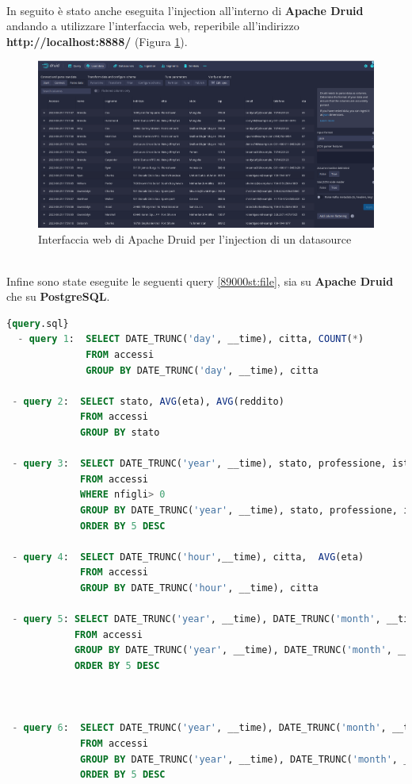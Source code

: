 \\
In seguito è stato anche eseguita l'\gls{injection}{} all'interno di \textbf{Apache Druid} 
andando a utilizzare l'interfaccia web, reperibile all'indirizzo
\textbf{http://localhost:8888/} (Figura \ref{fig:injection}).
\begin{figure}[h]
  \centering
  \includegraphics[width=1\textwidth]{images/percorso/load_data.png}
  \caption{Interfaccia web di Apache Druid per l'injection di un datasource}
  \label{fig:injection}
\end{figure}
\pagebreak
\\
Infine sono state eseguite le seguenti query \ref{89000st:file}, sia su \textbf{Apache Druid} che su \textbf{PostgreSQL}.
\begin{lstlisting}[language=SQL, caption=\texttt{query.sql}, label=89000st:file]{query.sql}
  - query 1:  SELECT DATE_TRUNC('day', __time), citta, COUNT(*)
              FROM accessi
              GROUP BY DATE_TRUNC('day', __time), citta
       
 - query 2:  SELECT stato, AVG(eta), AVG(reddito)
             FROM accessi
             GROUP BY stato
       
 - query 3:  SELECT DATE_TRUNC('year', __time), stato, professione, istruzione, nfigli, COUNT(*)
             FROM accessi
             WHERE nfigli> 0
             GROUP BY DATE_TRUNC('year', __time), stato, professione, istruzione, nfigli
             ORDER BY 5 DESC
       
 - query 4:  SELECT DATE_TRUNC('hour',__time), citta,  AVG(eta)
             FROM accessi
             GROUP BY DATE_TRUNC('hour', __time), citta  
 
 - query 5: SELECT DATE_TRUNC('year', __time), DATE_TRUNC('month', __time), DATE_TRUNC('day', __time),    stato, professione, istruzione, nfigli, COUNT(*) 
            FROM accessi
            GROUP BY DATE_TRUNC('year', __time), DATE_TRUNC('month', __time), DATE_TRUNC('day', __time), stato, professione, istruzione, nfigli
            ORDER BY 5 DESC



 - query 6:  SELECT DATE_TRUNC('year', __time), DATE_TRUNC('month', __time), DATE_TRUNC('day', __time), DATE_TRUNC('hour', __time), stato, professione, istruzione, nfigli, COUNT(*) 
             FROM accessi
             GROUP BY DATE_TRUNC('year', __time), DATE_TRUNC('month', __time), DATE_TRUNC('day', __time), DATE_TRUNC('hour', __time), stato, professione, istruzione, nfigli
             ORDER BY 5 DESC           
 \end{lstlisting}

